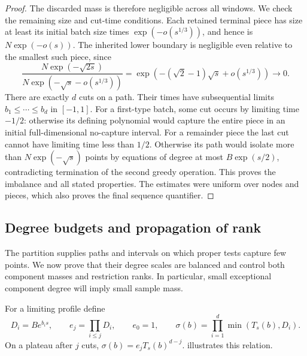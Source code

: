 \begin{proof}
The discarded mass is therefore negligible across all windows. We check the remaining size and cut-time conditions. Each retained terminal piece has size at least its initial batch size times $\exp(-o(s^{1/3}))$, and hence is $N\exp(-o(s))$.  The inherited lower boundary is negligible even relative to the smallest such piece, since
\[
 \frac{N\exp(-\sqrt{2s})}
 {N\exp(-\sqrt{s}-o(s^{1/3}))}
 =\exp(-(\sqrt2-1)\sqrt{s}+o(s^{1/3}))\to0.
\]
There are exactly $d$ cuts on a path.  Their times have subsequential limits $b_1\le\cdots\le b_d$ in $[-1,1]$.  For a first-type batch, some cut occurs by limiting time $-1/2$: otherwise its defining polynomial would capture the entire piece in an initial full-dimensional no-capture interval.  For a remainder piece the last cut cannot have limiting time less than $1/2$.  Otherwise its path would isolate more than $N\exp(-\sqrt{s})$ points by equations of degree at most $B\exp(s/2)$, contradicting termination of the second greedy operation.  This proves the imbalance and all stated properties.  The estimates were uniform over nodes and pieces, which also proves the final sequence quantifier.
\end{proof}

\subsection{Degree budgets and propagation of rank}

The partition supplies paths and intervals on which proper tests capture few points.  We now prove that their degree scales are balanced and control both component masses and restriction ranks. In particular, small exceptional component degree will imply small sample mass.

For a limiting profile define
\begin{equation}\label{eq:prof-profile-functions}
 D_i=B e^{b_i s},\qquad e_j=\prod_{i\le j}D_i,\qquad e_0=1,
 \qquad \sigma(b)=\prod_{i=1}^d\min(T_s(b),D_i).
\end{equation}
On a plateau after $j$ cuts, $\sigma(b)=e_jT_s(b)^{d-j}$.  illustrates this relation.

